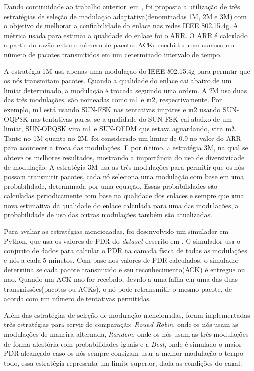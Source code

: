 Dando continuidade ao trabalho anterior, em \cite{gomes2020improving}, foi proposta a utilização de três estratégias de seleção de modulação adaptativa(denominadas 1M, 2M e 3M) com o objetivo de melhorar a confiabilidade do enlace nas redes IEEE 802.15.4g. 
A métrica usada para estimar a qualidade do enlace foi o ARR. O ARR é calculado a partir da razão entre o número de pacotes ACKs recebidos com sucesso e o número de pacotes transmitidos em um determinado intervalo de tempo.    

A estratégia 1M usa apenas uma modulação do IEEE 802.15.4g para permitir que os nós transmitam pacotes. Quando a qualidade do enlace cai abaixo de um limiar determinado, a modulação é trocada seguindo uma ordem. A 2M usa duas das três modulações, são nomeadas como m1 e m2, respectivamente. Por exemplo, m1 está usando SUN-FSK nas tentativas impares e m2 usando SUN-OQPSK nas tentativas pares, se a qualidade do SUN-FSK cai abaixo de um limiar, SUN-OPQSK vira m1 e SUN-OFDM que estava aguardando, vira m2. Tanto no 1M quanto no 2M, foi considerado um limiar de 0.9 no valor do ARR para acontecer a troca das modulações. E por último, a estratégia 3M, na qual se obteve os melhores resultados, mostrando a importância do uso de diversividade de modulação. A estratégia 3M usa as três modulações para permitir que os nós possam transmitir pacotes, cada nó seleciona uma modulação com base em uma probabilidade, determinada por uma equação. Essas probabilidades são calculadas periodicamente com base na qualidade dos enlaces e sempre que uma nova estimativa da qualidade do enlace calculada para uma das modulações, a probabilidade de uso das outras modulações também são atualizadas.

Para avaliar as estratégias mencionadas, foi desenvolvido um simulador em Python, que usa os valores de PDR do \textit{dataset} descrito em \cite{tuset2020evaluating}. O simulador usa o conjunto de dados para calcular o PDR na camada física de todas as modulações e nós a cada 5 minutos. Com base nos valores de PDR calculados, o simulador determina se cada pacote transmitido e seu reconhecimento(ACK) é entregue ou não. Quando um ACK não for recebido, devido a uma falha em uma das duas transmissões(pacotes ou ACKs), o nó pode retransmitir o mesmo pacote, de acordo com um número de tentativas permitidas.

Além das estratégias de seleção de modulação mencionadas, foram implementadas três estratégias para servir de comparação: \textit{Round-Robin}, onde os nós usam as modulações de maneira alternada, \textit{Random}, onde os nós usam as três modulações de forma aleatória com probabilidades iguais e a \textit{Best}, onde é simulado o maior PDR alcançado caso os nós sempre consigam usar a melhor modulação
o tempo todo, essa estratégia representa um limite superior, dada as condições do canal.

